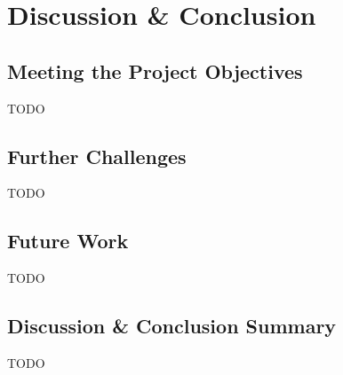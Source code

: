 
\chapter{Discussion \& Conclusion}
\section{Meeting the Project Objectives}
TODO
\section{Further Challenges}
TODO
\section{Future Work}
TODO
\section{Discussion \& Conclusion Summary}
TODO